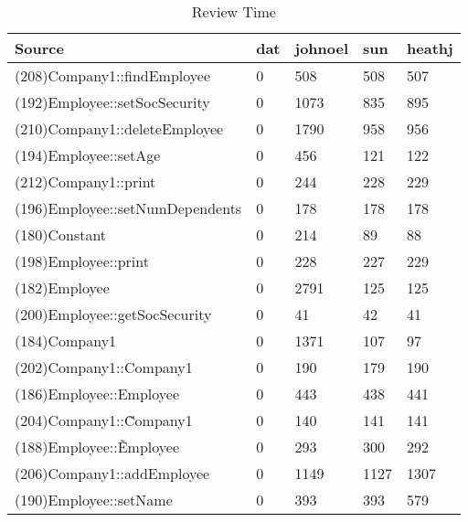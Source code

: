 \begin{table}[hb]
\begin{center}
\begin{tabular}{|l|l|l|l|l|}
\hline
Source & dat & johnoel & sun & heathj\\
\hline
(208)Company1::findEmployee & 0 & 508 & 508 & 507\\
(192)Employee::setSocSecurity & 0 & 1073 & 835 & 895\\
(210)Company1::deleteEmployee & 0 & 1790 & 958 & 956\\
(194)Employee::setAge & 0 & 456 & 121 & 122\\
(212)Company1::print & 0 & 244 & 228 & 229\\
(196)Employee::setNumDependents & 0 & 178 & 178 & 178\\
(180)Constant & 0 & 214 & 89 & 88\\
(198)Employee::print & 0 & 228 & 227 & 229\\
(182)Employee & 0 & 2791 & 125 & 125\\
(200)Employee::getSocSecurity & 0 & 41 & 42 & 41\\
(184)Company1 & 0 & 1371 & 107 & 97\\
(202)Company1::Company1 & 0 & 190 & 179 & 190\\
(186)Employee::Employee & 0 & 443 & 438 & 441\\
(204)Company1::\~Company1 & 0 & 140 & 141 & 141\\
(188)Employee::\~Employee & 0 & 293 & 300 & 292\\
(206)Company1::addEmployee & 0 & 1149 & 1127 & 1307\\
(190)Employee::setName & 0 & 393 & 393 & 579\\
\hline
\end{tabular}
\end{center}
\caption{Review Time}
\end{table}


